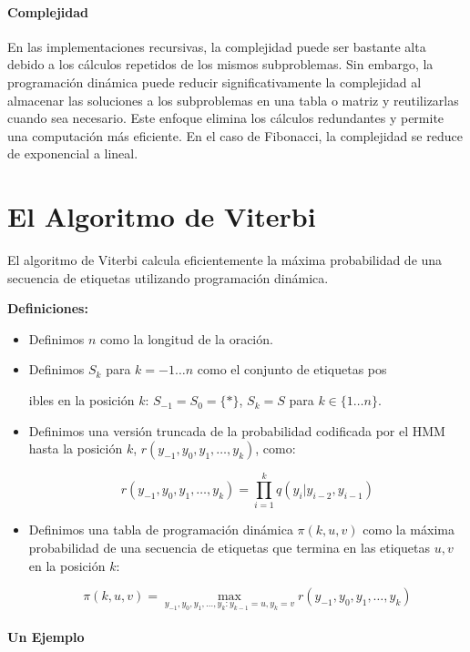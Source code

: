 \paragraph{Complejidad}

En las implementaciones recursivas, la complejidad puede ser bastante alta debido a los cálculos repetidos de los mismos subproblemas. Sin embargo, la programación dinámica puede reducir significativamente la complejidad al almacenar las soluciones a los subproblemas en una tabla o matriz y reutilizarlas cuando sea necesario. Este enfoque elimina los cálculos redundantes y permite una computación más eficiente. En el caso de Fibonacci, la complejidad se reduce de exponencial a lineal.

\section{El Algoritmo de Viterbi}

El algoritmo de Viterbi calcula eficientemente la máxima probabilidad de una secuencia de etiquetas utilizando programación dinámica.

\textbf{Definiciones:}

\begin{itemize}
    \item Definimos $n$ como la longitud de la oración.
    \item Definimos $S_k$ para $k = -1 \ldots n$ como el conjunto de etiquetas pos

ibles en la posición $k$: $S_{-1} = S_0 = \{*\}$, $S_k = S$ para $k \in \{1 \ldots n\}$.
    \item Definimos una versión truncada de la probabilidad codificada por el HMM hasta la posición $k$, $r(y_{-1}, y_0, y_1, \ldots, y_k)$, como:
    
    \[
    r(y_{-1}, y_0, y_1, \ldots, y_k) = \prod_{i=1}^{k} q(y_i | y_{i-2}, y_{i-1})
    \]
    
    \item Definimos una tabla de programación dinámica $\pi(k, u, v)$ como la máxima probabilidad de una secuencia de etiquetas que termina en las etiquetas $u, v$ en la posición $k$:
    
    \[
    \pi(k, u, v) = \max_{y_{-1}, y_0, y_1, \ldots, y_k : y_{k-1} = u, y_k = v} r(y_{-1}, y_0, y_1, \ldots, y_k)
    \]
\end{itemize}

\paragraph{Un Ejemplo}

